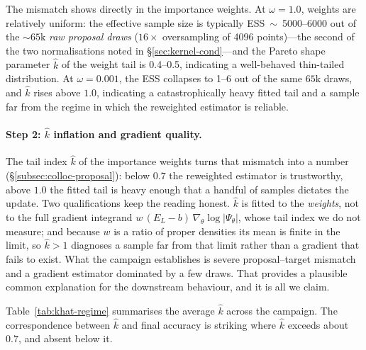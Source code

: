 The mismatch shows directly in the importance weights.
At $\omega{=}1.0$, weights are relatively uniform:
the effective sample size is typically ESS~$\sim$~5000--6000
out of the ${\sim}65\text{k}$ \emph{raw proposal draws} ($16{\times}$ oversampling of 4096
points)---the second of the two normalisations noted in
\S\ref{sec:kernel-cond}---and the Pareto shape parameter $\hat{k}$ of the
weight tail is 0.4--0.5, indicating a well-behaved thin-tailed
distribution.
At $\omega{=}0.001$, the ESS collapses to 1--6 out of the same
$65\text{k}$ draws, and $\hat{k}$ rises above $1.0$, indicating a
catastrophically heavy fitted tail and a sample far from the regime in which the reweighted
estimator is reliable.

\paragraph{Step 2: $\hat{k}$ inflation and gradient quality.}
The tail index $\hat{k}$ of the importance weights turns that mismatch into a number
(\S\ref{subsec:colloc-proposal}): below $0.7$ the reweighted estimator is trustworthy,
above $1.0$ the fitted tail is heavy enough that a handful of samples dictates the update.
Two qualifications keep the reading honest. $\hat k$ is fitted to the \emph{weights}, not to
the full gradient integrand $w\,(E_L-b)\,\nabla_\theta\log|\Psi_\theta|$, whose tail index
we do not measure; and because $w$ is a ratio of proper densities its mean is finite in the
limit, so $\hat k>1$ diagnoses a sample far from that limit rather than a gradient that
fails to exist. What the campaign establishes is severe proposal--target mismatch and a
gradient estimator dominated by a few draws. That provides a plausible common explanation
for the downstream behaviour, and it is all we claim.

Table~\ref{tab:khat-regime} summarises the average $\hat{k}$ across
the campaign.
The correspondence between $\hat{k}$ and final accuracy is
striking where $\hat k$ exceeds about $0.7$, and absent below it.

